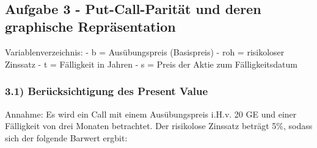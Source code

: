 \documentclass[paper=landscape]{scrartcl}
\begin{document}
    \begin{center}
    \end{center}
    { \hspace*{\fill} \\}
    
    \hypertarget{aufgabe-3---put-call-parituxe4t-und-deren-graphische-repruxe4sentation}{%
\subsection{Aufgabe 3 - Put-Call-Parität und deren graphische
Repräsentation}\label{aufgabe-3---put-call-parituxe4t-und-deren-graphische-repruxe4sentation}}

Variablenverzeichnis: - b = Ausübungspreis (Basispreis) - roh =
risikoloser Zinssatz - t = Fälligkeit in Jahren - s = Preis der Aktie
zum Fälligkeitsdatum

\hypertarget{beruxfccksichtigung-des-present-value}{%
\subsubsection{3.1) Berücksichtigung des Present
Value}\label{beruxfccksichtigung-des-present-value}}

Annahme: Es wird ein Call mit einem Ausübungspreis i.H.v. 20 GE und
einer Fälligkeit von drei Monaten betrachtet. Der risikolose Zinssatz
beträgt 5\%, sodass sich der folgende Barwert ergbit:
\end{document}
